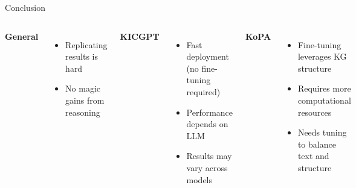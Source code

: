 \documentclass[aspectratio=169,xcolor=dvipsnames]{beamer}
\begin{document}


\begin{frame}{Conclusion}

    \begin{columns}[t]
        \textbf{General}
        \begin{itemize}
            \item Replicating results is hard
            \item No magic gains from reasoning
        \end{itemize}

        \textbf{KICGPT}
        \begin{itemize}
            \item Fast deployment (no fine-tuning required)
            \item Performance depends on LLM
            \item Results may vary across models
        \end{itemize}
        \textbf{KoPA}
        \begin{itemize}
            \item Fine-tuning leverages KG structure
            \item Requires more computational resources
            \item Needs tuning to balance text and structure
        \end{itemize}
    \end{columns}
    \vspace{4mm}
    \begin{center}
    \end{center}
\end{frame}
\end{document}
